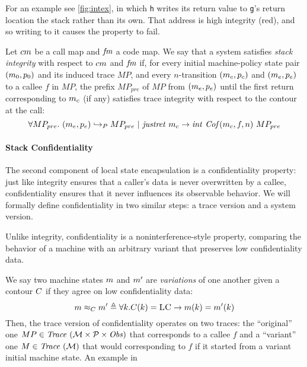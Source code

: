 \documentclass[acmsmall,review,anonymous]{acmart}\settopmatter{printfolios=true,printccs=false,printacmref=false}
\begin{document}
For an example see \cref{fig:intex}, in which {\tt h} writes its return
value to {\tt g}'s return location the stack rather than its own. That address
is high integrity (red), and so writing to it causes the property to fail.

Let $cm$ be a call map and $\mathit{fm}$ a code map. We say that a
system satisfies {\em stack integrity} with respect to $cm$ and
$\mathit{fm}$ if, for every initial machine-policy state pair $(m_0,
p_0)$ and its induced trace $MP$, and every $n$-transition
$(m_c, p_c)$ and $(m_e, p_e)$ to a callee $f$ in $MP$,
the prefix $MP_{pre}$ of $MP$ from $(m_e, p_e)$ until the first
return corresponding to $m_c$ (if any) satisfies trace integrity
with respect to the contour at the call:
%
$$\forall MP_{pre}. ~ (m_e,p_e) \hookrightarrow_P
MP_{pre} ~ | ~ \mathit{justret}\ m_c \rightarrow
\mathit{int}~\mathit{Cof}(m_c, f, n)~MP_{pre}$$

\paragraph*{Stack Confidentiality}

The second component of local state encapsulation is a confidentiality
property: just like integrity ensures that a caller's data is never
overwritten by a callee, confidentiality ensures that it never
influences its observable behavior. We will formally define
confidentiality in two similar steps: a trace version and a system
version.

Unlike integrity, confidentiality is a noninterference-style property,
comparing the behavior of a machine with an arbitrary variant that
preserves low confidentiality data.

We say two machine states $m$ and $m'$ are {\em variations} of one
another given a contour $C$ if they agree on low
confidentiality data:
%
\[
m \approx_C m' \triangleq \forall k .
C(k) = \textsc{LC} \rightarrow m(k) =
m'(k)
\]
%
Then, the trace version of confidentiality operates on two traces: the
``original'' one $MP \in \mathit{Trace}~({\mathcal M} \times \mathcal{P} \times \mathit{Obs})$ that corresponds to a callee $f$
and a ``variant'' one $M \in \mathit{Trace}~({\mathcal M})$ that would corresponding to $f$
if it started from a variant initial machine state. An example in
\end{document}
